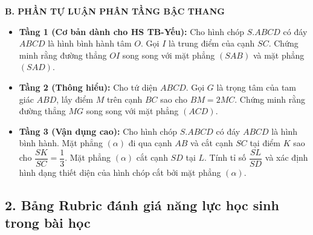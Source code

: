 \documentclass[12pt, a4paper]{article}
\begin{document}
\noindent \textbf{B. PHẦN TỰ LUẬN PHÂN TẦNG BẬC THANG}
\begin{itemize}[leftmargin=0.6cm]
    \item \textbf{Tầng 1 (Cơ bản dành cho HS TB-Yếu):} Cho hình chóp $S.ABCD$ có đáy $ABCD$ là hình bình hành tâm $O$. Gọi $I$ là trung điểm của cạnh $SC$. Chứng minh rằng đường thẳng $OI$ song song với mặt phẳng $(SAB)$ và mặt phẳng $(SAD)$.
    \item \textbf{Tầng 2 (Thông hiểu):} Cho tứ diện $ABCD$. Gọi $G$ là trọng tâm của tam giác $ABD$, lấy điểm $M$ trên cạnh $BC$ sao cho $BM = 2MC$. Chứng minh rằng đường thẳng $MG$ song song với mặt phẳng $(ACD)$.
    \item \textbf{Tầng 3 (Vận dụng cao):} Cho hình chóp $S.ABCD$ có đáy $ABCD$ là hình bình hành. Mặt phẳng $(\alpha)$ đi qua cạnh $AB$ và cắt cạnh $SC$ tại điểm $K$ sao cho $\dfrac{SK}{SC} = \dfrac{1}{3}$. Mặt phẳng $(\alpha)$ cắt cạnh $SD$ tại $L$. Tính tỉ số $\dfrac{SL}{SD}$ và xác định hình dạng thiết diện của hình chóp cắt bởi mặt phẳng $(\alpha)$.
\end{itemize}

\subsection*{2. Bảng Rubric đánh giá năng lực học sinh trong bài học}
\end{document}
